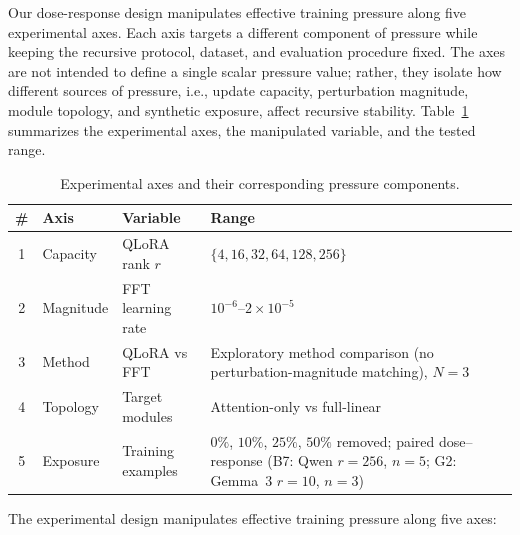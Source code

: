 \documentclass[a4paper,fleqn]{cas-dc}
\newif\ifshowchanges
\newcommand{\rev}[1]{\ifshowchanges{\color{blue}#1}\else{#1}\fi}
\begin{document}
Our dose-response design manipulates effective training pressure along five
experimental axes. Each axis targets a different component of pressure while
keeping the recursive protocol, dataset, and evaluation procedure fixed. The
axes are not intended to define a single scalar pressure value; rather, they
isolate how different sources of pressure, i.e., update capacity, perturbation
magnitude, module topology, and synthetic exposure, affect recursive stability.
Table~\ref{tab:axes} summarizes the experimental axes, the manipulated variable,
and the tested range.

\begin{table}[pos=htbp]
\caption{Experimental axes and their corresponding pressure
components.}\label{tab:axes}
\footnotesize
\begin{tabular}{@{}c l >{\raggedright}p{2.2cm} >{\raggedright\arraybackslash}p{4.6cm}@{}}
\toprule
\textbf{\#} & \textbf{Axis} & \textbf{Variable} & \textbf{Range} \\
\midrule
1 & Capacity & QLoRA rank $r$ & $\{4, 16, 32, 64, 128, 256\}$ \\[2pt]
2 & Magnitude & FFT learning rate & $10^{-6}$--$2{\times}10^{-5}$ \\[2pt]
3 & Method & QLoRA vs FFT & \rev{Exploratory method comparison (no perturbation-magnitude matching)}, $N{=}3$ \\[2pt]
4 & Topology & Target modules & Attention-only vs full-linear \\[2pt]
5 & Exposure & Training examples & \rev{$0\%$, $10\%$, $25\%$, $50\%$ removed;
  paired dose--response (B7: Qwen $r{=}256$, $n{=}5$; G2: Gemma~3 $r{=}10$, $n{=}3$)} \\
\bottomrule
\end{tabular}
\end{table}

The experimental design manipulates effective training pressure along five axes:
\end{document}
